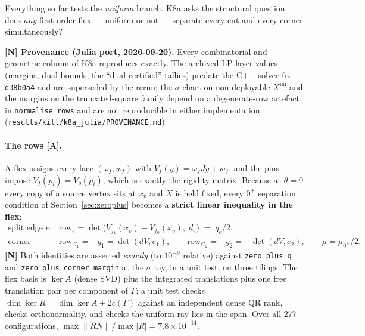 \documentclass[11pt,a4paper]{article}
\theoremstyle{definition}
\newcommand{\file}[1]{\texttt{\small #1}}
\begin{document}
Everything so far tests the \emph{uniform} branch. K8a asks the structural question: does
\emph{any} first-order flex --- uniform or not --- separate every cut and every corner
simultaneously?

\noindent\textbf{[N] Provenance (Julia port, 2026-09-20).} Every combinatorial and geometric column of
K8a reproduces exactly. The archived LP-layer values (margins, dual bounds, the ``dual-certified''
tallies) predate the C++ solver fix \texttt{d38b0a4} and are superseded by the rerun; the
$\sigma$-chart on non-deployable $X^{\mathrm{ini}}$ and the margins on the truncated-square family
depend on a degenerate-row artefact in \file{normalise\_rows} and are not reproducible in either
implementation (\file{results/kill/k8a\_julia/PROVENANCE.md}).

\paragraph{The rows [A].} A flex assigns every face $(\omega_f,w_f)$ with
$V_f(y)=\omega_fJy+w_f$, and the pins impose $V_f(p_i)=V_g(p_i)$, which is exactly the
rigidity matrix. Because at $\theta=0$ every copy of a source vertex sits at $x_v$ and $X$ is
held fixed, every $0^+$ separation condition of Section~\ref{sec:zeroplus} becomes a
\textbf{strict linear inequality in the flex}:
\begin{align}
\text{split edge } e:\quad & \mathrm{row}_e = \det\bigl(V_{f_1}(x_v)-V_{f_0}(x_v),\; d_e\bigr) \;=\; q_e/2, \label{eq:rowsplit}\\
\text{corner incidence:}\quad & \mathrm{row}_{G_1} = -g_1 = \det(dV,e_1), \qquad
\mathrm{row}_{G_2} = -g_2 = -\det(dV,e_2), \qquad \mu = \mu_{0^+}/2 . \label{eq:rowcorner}
\end{align}
\textbf{[N]} Both identities are asserted \emph{exactly} (to $10^{-9}$ relative) against
\file{zero\_plus\_q} and \file{zero\_plus\_corner\_margin} at the $\sigma$ ray, in a unit test,
on three tilings. The flex basis is $\ker A$ (dense SVD) plus the integrated translations plus
one free translation pair per component of $\Gamma$; a unit test checks
$\dim\ker R = \dim\ker A + 2c(\Gamma)$ against an independent dense QR rank, checks
orthonormality, and checks the uniform ray lies in the span. Over all 277 configurations,
$\max\|RN\|/\max|R| = 7.8\times10^{-14}$.
\end{document}
